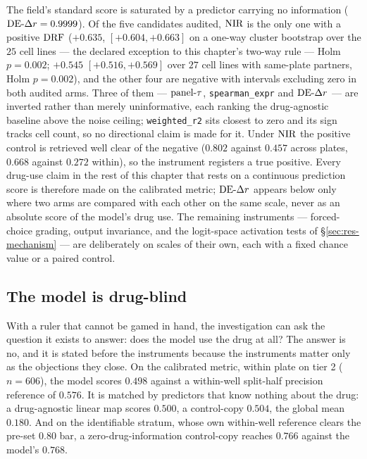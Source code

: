 \begin{claim}
The field's standard score is saturated by a predictor carrying no information ($\textrm{DE-}\Delta r = 0.9999$).
Of the five candidates audited, $\textrm{NIR}$ is the only one with a positive $\textrm{DRF}$ ($+0.635$,
$[+0.604, +0.663]$ on a one-way cluster bootstrap over the $25$ cell lines --- the declared
exception to this chapter's two-way rule --- Holm $p = 0.002$; $+0.545$ $[+0.516, +0.569]$
over $27$ cell lines with same-plate partners, Holm $p = 0.002$), and the other four are negative
with intervals excluding zero in both audited arms. Three of them --- $\textrm{panel-}\tau$,
\texttt{spearman\_expr} and $\textrm{DE-}\Delta r$ --- are inverted rather than merely uninformative, each
ranking the drug-agnostic baseline above the noise ceiling; \texttt{weighted\_r2} sits closest to
zero and its sign tracks cell count, so no directional claim is made for it. Under $\textrm{NIR}$ the positive control is retrieved
well clear of the negative ($0.802$ against $0.457$ across plates, $0.668$ against $0.272$ within),
so the instrument registers a true positive. Every drug-use claim in the rest of this chapter that
rests on a continuous prediction score is therefore made on the calibrated metric; $\textrm{DE-}\Delta r$ appears
below only where two arms are compared with each other on the same scale, never as an absolute score
of the model's drug use. The remaining instruments --- forced-choice grading, output invariance, and
the logit-space activation tests of \S\ref{sec:res-mechanism} --- are deliberately on scales of their
own, each with a fixed chance value or a paired control.
\end{claim}

\subsection{The model is drug-blind}
\label{sec:methods-controls}
\label{sec:res-blind}

With a ruler that cannot be gamed in hand, the investigation can ask the question it exists to
answer: does the model use the drug at all? The answer is no, and it is stated before the
instruments because the instruments matter only as the objections they close. On the calibrated
metric, within plate on tier 2 ($n = 606$), the model scores $0.498$ against a within-well split-half
precision reference of $0.576$. It is matched by predictors that know nothing about the drug: a drug-agnostic linear map
scores $0.500$, a control-copy $0.504$, the global mean $0.180$. And on the identifiable stratum,
whose own within-well reference clears the pre-set $0.80$ bar, a zero-drug-information control-copy reaches $0.766$ against
the model's $0.768$.

